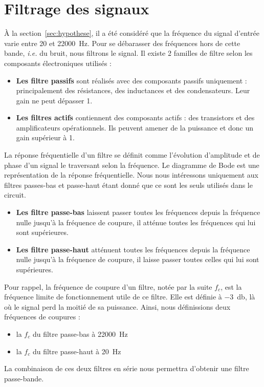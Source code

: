 \documentclass[10pt, oneside, a4paper]{article}
\begin{document}
\section{Filtrage des signaux}
À la section~\ref{sec:hypothese}, il a été considéré que la fréquence du signal d'entrée varie entre \num{20} et \SI{22000}{\hertz}.
Pour se débarasser des fréquences hors de cette bande, \textit{i.e.} du bruit, nous filtrons le signal.
Il existe 2 familles de filtre selon les composants électroniques utilisés :
\begin{itemize}
    \item\textbf{Les filtre passifs} sont réalisés avec des composants passifs uniquement : principalement des résistances, des inductances et des condensateurs.
        Leur gain ne peut dépasser 1.
    \item\textbf{Les filtres actifs} contiennent des composants actifs : des transistors et des amplificateurs opérationnels.
        Ils peuvent amener de la puissance et donc un gain supérieur à 1.
\end{itemize}
La réponse fréquentielle d'un filtre se définit comme l'évolution d'amplitude et de phase d'un signal le traversant selon la fréquence.
Le diagramme de Bode est une représentation de la réponse fréquentielle.
Nous nous intéressons uniquement aux filtres passes-bas et passe-haut étant donné que ce sont les seuls utilisés dans le circuit.
\begin{itemize}
    \item\textbf{Les filtre passe-bas} laissent passer toutes les fréquences depuis
        la fréquence nulle jusqu'à la fréquence de coupure, il atténue toutes les
        fréquences qui lui sont supérieures.
    \item\textbf{Les filtre passe-haut} atténuent toutes les fréquences depuis la
        fréquence nulle jusqu'à la fréquence de coupure, il laisse passer toutes
        celles qui lui sont supérieures.
\end{itemize}
Pour rappel, la fréquence de coupure d'un filtre, notée par la suite $f_c$, est la fréquence limite de fonctionnement utile de ce filtre.
Elle est définie à \SI{-3}{\decibel}, là où le signal perd la moitié de sa puissance.
Ainsi, nous définissions deux fréquences de coupures :
\begin{itemize}
    \item la $f_c$ du filtre passe-bas à \SI{22000}{\hertz}
    \item la $f_c$ du filtre passe-haut à \SI{20}{\hertz}
\end{itemize}
La combinaison de ces deux filtres en série nous permettra d'obtenir une filtre passe-bande.
\end{document}
